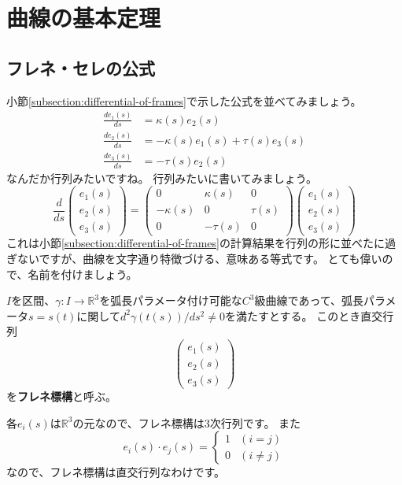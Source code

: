 \chapter{曲線の基本定理}

\section{フレネ・セレの公式}

小節\ref{subsection:differential-of-frames}で示した公式を並べてみましょう。
\begin{align*}
  \frac{de_1(s)}{ds}&=\kappa(s)e_2(s)\\
  \frac{de_2(s)}{ds}&=-\kappa(s)e_1(s)+\tau(s)e_3(s)\\
  \frac{de_3(s)}{ds}&=-\tau(s)e_2(s)
\end{align*}
なんだか行列みたいですね。
行列みたいに書いてみましょう。
\[
  \frac{d}{ds}
  \begin{pmatrix}
    e_1(s)\\
    e_2(s)\\
    e_3(s)
  \end{pmatrix}
  =
  \begin{pmatrix}
    0 & \kappa(s) & 0 \\
    -\kappa(s) & 0 & \tau(s) \\
    0 & -\tau(s) & 0
  \end{pmatrix}
  \begin{pmatrix}
    e_1(s)\\
    e_2(s)\\
    e_3(s)
  \end{pmatrix}
\]
これは小節\ref{subsection:differential-of-frames}の計算結果を行列の形に並べたに過ぎないですが、曲線を文字通り特徴づける、意味ある等式です。
とても偉いので、名前を付けましょう。
\begin{definition}
  $I$を区間、$\gamma:I\to\mathbb{R}^3$を弧長パラメータ付け可能な$C^3$級曲線であって、弧長パラメータ$s=s(t)$に関して$d^2\gamma(t(s))/ds^2\neq0$を満たすとする。
  このとき直交行列
  \[
    \begin{pmatrix}
      e_1(s)\\
      e_2(s)\\
      e_3(s)
    \end{pmatrix}
  \]
  を\textbf{フレネ標構}と呼ぶ。
\end{definition}
各$e_i(s)$は$\mathbb{R}^3$の元なので、フレネ標構は3次行列です。
また
\[
  e_i(s)\cdot e_j(s)=\begin{cases}
    1 & (i=j)\\
    0 & (i\neq j)
  \end{cases}
\]
なので、フレネ標構は直交行列なわけです。

